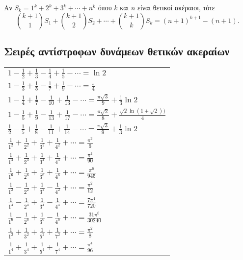 Αν $ S_{k} = 1^{k} + 2^{k} + 3^{k} + \cdots + n^{k} $ όπου $ k $ και $ n
$ είναι θετικοί ακέραιοι, τότε
\[
    \binom{k+1}{1} S_{1} + \binom{k+1}{2} S_{2} + \cdots + \binom{k+1}{k}
    S_{k} = (n+1)^{k+1} - (n+1).
\]
\subsection{Σειρές αντίστροφων δυνάμεων θετικών ακεραίων}

\begin{tabular}{l}
    $ 1 - \frac{1}{2} + \frac{1}{3} - \frac{1}{4} + \frac{1}{5} - \cdots =
    \ln{2} $ \\
    $ 1 - \frac{1}{3} + \frac{1}{5} - \frac{1}{7} + \frac{1}{9} - \cdots =
    \frac{\pi}{4} $ \\
    $ 1 - \frac{1}{4} + \frac{1}{7} - \frac{1}{10} + \frac{1}{13} - \cdots =
    \frac{\pi \sqrt{3}}{9} + \frac{1}{3} \ln{2} $ \\
    $ 1 - \frac{1}{5} + \frac{1}{9} - \frac{1}{13} + \frac{1}{17} - \cdots =
    \frac{\pi \sqrt{2}}{8} + \frac{\sqrt{2} \ln{(1 + \sqrt{2})})}{4} $ \\
    $ \frac{1}{2} - \frac{1}{5} + \frac{1}{8} - \frac{1}{11} + \frac{1}{14}
    - \cdots = \frac{\pi \sqrt{3}}{9} + \frac{1}{3} \ln{2}$ \\
    $ \frac{1}{1^{2}} + \frac{1}{2^{2}} + \frac{1}{3^{2}} + \frac{1}{4^{2}}
    + \cdots = \frac{\pi ^{2}}{6} $ \\
    $ \frac{1}{1^{4}} + \frac{1}{2^{4}} + \frac{1}{3^{4}} + \frac{1}{4^{4}}
    + \cdots = \frac{\pi^{4}}{90}  $ \\
    $ \frac{1}{1^{6}} + \frac{1}{2^{6}} + \frac{1}{3^{6}} + \frac{1}{4^{6}}
    + \cdots = \frac{\pi ^{6}}{945} $ \\
    $ \frac{1}{1^{2}} - \frac{1}{2^{2}} + \frac{1}{3^{2}} - \frac{1}{4^{2}}
    + \cdots = \frac{\pi ^{2}}{12} $ \\
    $ \frac{1}{1^{4}} - \frac{1}{2^{4}} + \frac{1}{3^{4}} - \frac{1}{4^{4}}
    + \cdots = \frac{7 \pi ^{4}}{720} $ \\
    $ \frac{1}{1^{6}} - \frac{1}{2^{6}} + \frac{1}{3^{6}} - \frac{1}{4^{6}}
    + \cdots = \frac{31 \pi ^{6}}{30240} $ \\
    $ \frac{1}{1^{2}} + \frac{1}{3^{2}} + \frac{1}{5^{2}} + \frac{1}{7^{2}}
    + \cdots = \frac{\pi ^{2}}{8} $ \\
    $ \frac{1}{1^{4}} + \frac{1}{3^{4}} + \frac{1}{5^{4}} + \frac{1}{7^{4}}
    + \cdots = \frac{\pi ^{4}}{96}  $ \\

\end{tabular}
